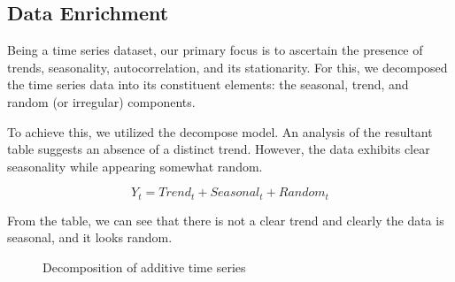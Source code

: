 \documentclass[10pt]{article}
\begin{document}
\subsection{Data Enrichment}

Being a time series dataset, our primary focus is to ascertain the presence of trends, seasonality, autocorrelation, and its stationarity. For this, we decomposed the time series data into its constituent elements: the seasonal, trend, and random (or irregular) components.

To achieve this, we utilized the decompose model. An analysis of the resultant table suggests an absence of a distinct trend. However, the data exhibits clear seasonality while appearing somewhat random.

\[Y_{t}=Trend_{t}+Seasonal_{t}+Random_{t}\]

From the table, we can see that there is not a clear trend and clearly the data is seasonal, and it looks random.


\begin{figure}[H]
    \centering
    \caption{Decomposition of additive time series}
    \label{Decomposition1}
\end{figure}
\end{document}
